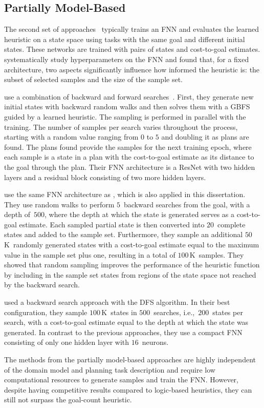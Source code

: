 \subsection{Partially Model-Based}
\label{sec:related-work-partially}

The second set of approaches~\cite{ferber2020neural, yu2020learning, ferber2022neural, otoole2022sampling} typically trains an FNN and evaluates the learned heuristic on a state space using tasks with the same goal and different initial states. These networks are trained with pairs of states and cost-to-goal estimates. \citet{ferber2020neural} systematically study hyperparameters on the FNN and found that, for a fixed architecture, two aspects significantly influence how informed the heuristic is: the subset of selected samples and the size of the sample set.

\citet{ferber2022neural} use a combination of backward and forward searches~\cite{arfaee2011learning}. First, they generate new initial states with backward random walks and then solves them with a GBFS guided by a learned heuristic. The sampling is performed in parallel with the training. The number of samples per search varies throughout the process, starting with a random value ranging from $0$ to $5$ and doubling it as plans are found. The plans found provide the samples for the next training epoch, where each sample is a state in a plan with the cost-to-goal estimate as its distance to the goal through the plan. Their FNN architecture is a ResNet with two hidden layers and a residual block consisting of two more hidden layers.

\citet{otoole2022sampling} use the same FNN architecture as \citet{ferber2022neural}, which is also applied in this dissertation. They use random walks to perform $5$~backward searches from the goal, with a depth of~$500$, where the depth at which the state is generated serves as a cost-to-goal estimate. Each sampled partial state is then converted into $20$~complete states and added to the sample set. Furthermore, they sample an additional $50$\,K~randomly generated states with a cost-to-goal estimate equal to the maximum value in the sample set plus one, resulting in a total of $100$\,K~samples. They showed that random sampling improves the performance of the heuristic function by including in the sample set states from regions of the state space not reached by the backward search.

\citet{yu2020learning} used a backward search approach with the DFS algorithm. In their best configuration, they sample $100$\,K~states in $500$~searches, i.e.,~$200$~states per search, with a cost-to-goal estimate equal to the depth at which the state was generated. In contrast to the previous approaches, they use a compact FNN consisting of only one hidden layer with $16$~neurons.

The methods from the partially model-based approaches are highly independent of the domain model and planning task description and require low computational resources to generate samples and train the FNN. However, despite having competitive results compared to logic-based heuristics, they can still not surpass the goal-count heuristic.
